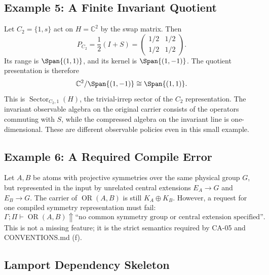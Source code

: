 \subsection{Example 5: A Finite Invariant Quotient}

Let \(C_2=\{1,s\}\) act on \(H=\mathbb C^2\) by the swap matrix.  Then
\[
  P_{C_2}=\frac12(I+S)
  =\begin{pmatrix}1/2&1/2\\1/2&1/2\end{pmatrix}.
\]
Its range is \(\Span\{(1,1)\}\), and its kernel is
\(\Span\{(1,-1)\}\).  The quotient presentation is therefore
\[
  \mathbb C^2/\Span\{(1,-1)\}\cong \Span\{(1,1)\}.
\]
This is \(\operatorname{Sector}_{C_2,1}(H)\), the trivial-irrep sector of the
\(C_2\) representation.
The invariant observable algebra on the original carrier consists of the
operators commuting with \(S\), while the compressed algebra on the invariant
line is one-dimensional.  These are different observable policies even in this
small example.

\subsection{Example 6: A Required Compile Error}

Let \(A,B\) be atoms with projective symmetries over the same physical group
\(G\), but represented in the input by unrelated central extensions \(E_A\to G\)
and \(E_B\to G\).  The carrier of \(\operatorname{OR}(A,B)\) is still
\(K_A\oplus K_B\).  However, a request for one compiled symmetry representation
must fail:
\[
  \Gamma;\Pi \vdash \operatorname{OR}(A,B)\Uparrow
  \text{``no common symmetry group or central extension specified''.}
\]
This is not a missing feature; it is the strict semantics required by CA-05 and
CONVENTIONS.md (f).

\subsection{Lamport Dependency Skeleton}

